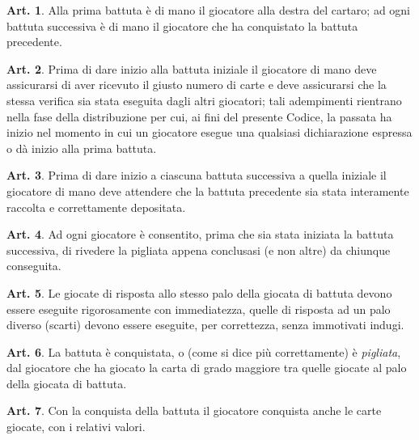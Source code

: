 \documentclass[italian,a4paper]{book}
\theoremstyle{definition}
\newtheorem{art}{Art.}
\begin{document}
\begin{art}
    Alla prima battuta è di mano il giocatore alla destra del cartaro; ad ogni battuta successiva è di mano il giocatore che ha conquistato la battuta precedente.
\end{art}
\begin{art}
    Prima di dare inizio alla battuta iniziale il giocatore di mano deve
    assicurarsi di aver ricevuto il giusto numero di carte e deve
    assicurarsi che la stessa verifica sia stata eseguita dagli altri
    giocatori; tali adempimenti rientrano nella fase della distribuzione per
    cui, ai fini del presente Codice, la passata ha inizio nel momento in
    cui un giocatore esegue una qualsiasi dichiarazione espressa o d\`a inizio alla prima battuta.
\end{art}
\begin{art}
    Prima di dare inizio a ciascuna battuta successiva a quella iniziale il giocatore di mano deve attendere che la battuta precedente sia stata interamente raccolta e correttamente depositata.
\end{art}
\begin{art}
    Ad ogni giocatore è consentito, prima che sia stata iniziata la battuta
    successiva, di rivedere la pigliata appena conclusasi (e non altre) da chiunque conseguita.
\end{art}
\begin{art}
    Le giocate di risposta allo stesso palo della giocata di battuta devono essere eseguite rigorosamente con immediatezza, quelle di risposta ad un palo diverso (scarti) devono essere eseguite, per correttezza, senza immotivati indugi.
\end{art}
\begin{art}
    La battuta è conquistata, o (come si dice più correttamente) è
    \emph{pigliata}, dal giocatore che ha giocato la carta di grado maggiore tra quelle giocate al palo della giocata di battuta.
\end{art}
\begin{art}
    Con la conquista della battuta il giocatore
    conquista anche le carte giocate, con i relativi valori.
\end{art}
\end{document}

